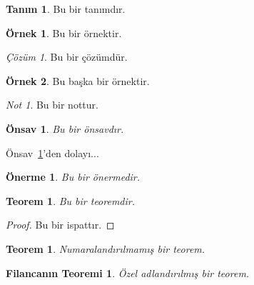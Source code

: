 \documentclass{article}
\theoremstyle{plain} %
\newtheorem{prop}{Önerme}
\newtheorem{lem}{Önsav}
\newtheorem{thm}{Teorem}
\newtheorem*{thm*}{Teorem} %
\newtheorem*{thm1*}{Filancanın Teoremi} %
\theoremstyle{definition}
\newtheorem{defn}{Tanım}
\newtheorem{ex}{Örnek}
\theoremstyle{remark}
\newtheorem*{rem}{Not}
\theoremstyle{solution}
\newtheorem*{soln}{Çözüm}
\begin{document}
\lipsum[1][1-6]

\begin{defn}
Bu bir tanımdır.
\end{defn}

\lipsum[1][7-12]

\begin{ex}
Bu bir örnektir.
\end{ex}

\begin{soln}
Bu bir çözümdür.
\end{soln}

\begin{ex}
Bu başka bir örnektir.
\end{ex}

\lipsum[1][7-12]

\begin{rem}
Bu bir nottur.
\end{rem}

\lipsum[1][13-18]

\begin{lem} \label{lem:1}
Bu bir önsavdır.
\end{lem}

Önsav~\ref{lem:1}'den dolayı...

\begin{prop}
Bu bir önermedir.
\end{prop}

\lipsum[2][1-6]

\begin{thm}
Bu bir teoremdir.
\end{thm}

\begin{proof}
Bu bir ispattır.
\end{proof}

\lipsum[2][7-12]

\begin{thm*}
Numaralandırılmamış bir teorem.
\end{thm*}

\begin{thm1*}
Özel adlandırılmış bir teorem.
\end{thm1*}
\end{document}
